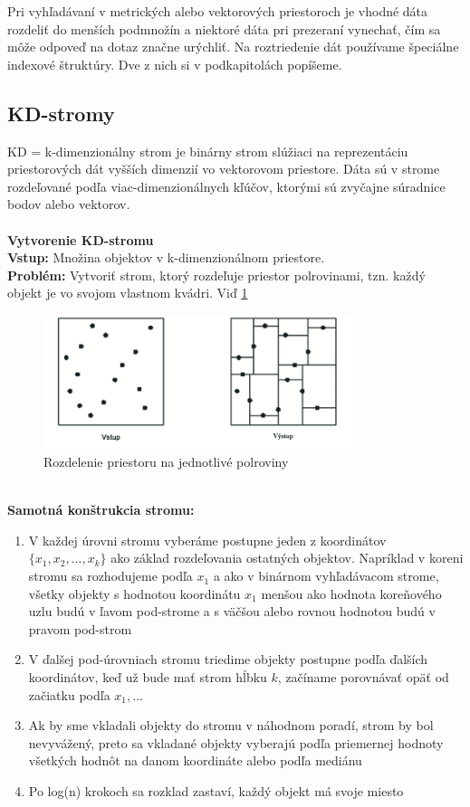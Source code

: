 \documentclass[12pt,a4paper,oneside]{fithesis2}
\begin{document}
Pri vyhľadávaní v metrických alebo vektorových priestoroch je vhodné dáta rozdeliť do menších podmnožín a niektoré dáta pri prezeraní vynechať, čím sa môže odpoveď na dotaz značne urýchliť. Na roztriedenie dát používame špeciálne indexové štruktúry. Dve z nich si v podkapitolách popíšeme.
\subsection{KD-stromy}
KD = k-dimenzionálny strom \cite{Kibriya2007} je binárny strom slúžiaci na reprezentáciu priestorových dát vyšších dimenzií vo vektorovom priestore. Dáta sú v strome rozdeľované podľa viac-dimenzionálnych kľúčov, ktorými sú zvyčajne súradnice bodov alebo vektorov. \\ \\
\textbf{Vytvorenie KD-stromu}\\
\textbf{Vstup:} Množina objektov v k-dimenzionálnom priestore. \\
\textbf{Problém:} Vytvoriť strom, ktorý rozdeľuje priestor polrovinami, tzn. každý objekt je vo svojom vlastnom kvádri. Viď \ref{fig:polroviny}\\
\begin{figure}[h]
  		\centering
  		\includegraphics[width=9cm]{obr/lp2.png}
  		\caption{Rozdelenie priestoru na jednotlivé polroviny}
  		\label{fig:polroviny}
\end{figure}\\
\textbf{Samotná konštrukcia stromu:}
\begin{enumerate}
\item V každej úrovni stromu vyberáme postupne jeden z koordinátov $ \{ x_1,x_2,...,x_k \} $ ako základ rozdeľovania ostatných objektov. Napríklad v koreni stromu sa rozhodujeme podľa $x_1$ a ako v binárnom vyhľadávacom strome, všetky objekty s hodnotou koordinátu $x_1$ menšou ako hodnota koreňového uzlu budú v ľavom pod-strome a s väčšou alebo rovnou hodnotou budú v pravom pod-strom
\item V ďalšej pod-úrovniach stromu triedime objekty postupne podľa ďalších koordinátov, keď už bude mať strom hĺbku $k$, začíname porovnávať opäť od začiatku podľa $x_1,...$
\item Ak by sme vkladali objekty do stromu v náhodnom poradí, strom by bol nevyvážený, preto sa vkladané objekty vyberajú podľa priemernej hodnoty všetkých hodnôt na danom koordináte alebo podľa mediánu
\item Po log(n) krokoch sa rozklad zastaví, každý objekt má svoje miesto
\end{enumerate} 
\end{document}
